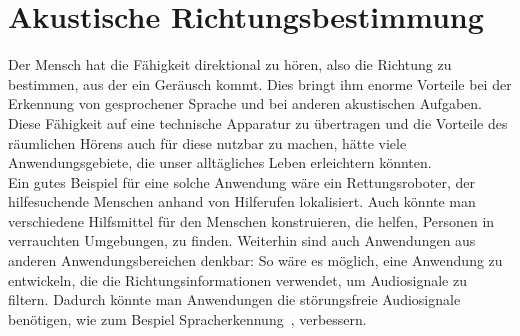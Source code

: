 \section{Akustische Richtungsbestimmung}
Der Mensch hat die Fähigkeit direktional zu hören, also die Richtung zu bestimmen, aus der ein Geräusch kommt. Dies bringt ihm enorme Vorteile bei der Erkennung von gesprochener Sprache und bei anderen akustischen Aufgaben. Diese Fähigkeit auf eine technische Apparatur zu übertragen und die Vorteile des räumlichen Hörens auch für diese nutzbar zu machen, hätte viele Anwendungsgebiete, die unser alltägliches Leben erleichtern könnten.\\
Ein gutes Beispiel für eine solche Anwendung wäre ein Rettungsroboter, der hilfesuchende Menschen anhand von Hilferufen lokalisiert. Auch könnte man verschiedene Hilfsmittel für den Menschen konstruieren, die helfen, Personen in verrauchten Umgebungen, zu finden.
Weiterhin sind auch Anwendungen aus anderen Anwendungsbereichen denkbar: So wäre es möglich, eine Anwendung zu entwickeln, die die Richtungsinformationen verwendet, um Audiosignale zu filtern. Dadurch könnte man Anwendungen die störungsfreie Audiosignale benötigen, wie zum Bespiel Spracherkennung~\cite{Spracherkennung}, verbessern.
